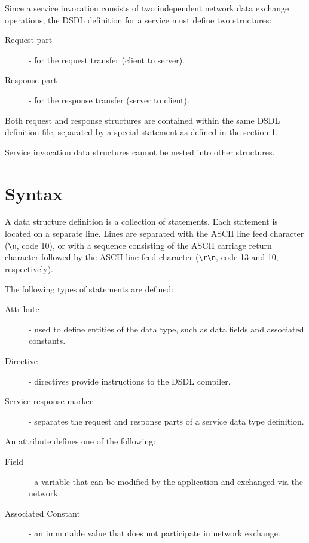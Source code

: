 Since a service invocation consists of two independent network data exchange operations,
the DSDL definition for a service must define two structures:

\begin{description}
    \item[Request part] - for the request transfer (client to server).
    \item[Response part] - for the response transfer (server to client).
\end{description}

Both request and response structures are contained within the same DSDL definition file,
separated by a special statement as defined in the section \ref{sec:dsdl_syntax}.

Service invocation data structures cannot be nested into other structures.

\section{Syntax}\label{sec:dsdl_syntax}

A data structure definition is a collection of statements.
Each statement is located on a separate line.
Lines are separated with the ASCII line feed character (\verb|\n|, code 10),
or with a sequence consisting of the ASCII carriage return character followed by the ASCII line feed character
(\verb|\r\n|, code 13 and 10, respectively).

The following types of statements are defined:

\begin{description}
    \item[Attribute] - used to define entities of the data type, such as data fields and associated constants.
    \item[Directive] - directives provide instructions to the DSDL compiler.
    \item[Service response marker] - separates the request and response parts of a service data type definition.
\end{description}

An attribute defines one of the following:

\begin{description}
    \item[Field] - a variable that can be modified by the application and exchanged via the network.
    \item[Associated Constant] - an immutable value that does not participate in network exchange.
\end{description}

